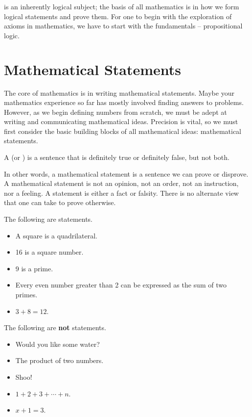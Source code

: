  is an inherently logical subject; the basis of all mathematics is in how we form logical statements and prove them. For one to begin with the exploration of axioms in mathematics, we have to start with the fundamentals -- propositional logic.

\section{Mathematical Statements}
The core of mathematics is in writing mathematical statements. Maybe your mathematics experience so far has mostly involved finding answers to problems. However, as we begin defining numbers from scratch, we must be adept at writing and communicating mathematical ideas. Precision is vital, so we must first consider the basic building blocks of all mathematical ideas: mathematical statements.

\begin{definition}
    A  (or ) is a sentence that is definitely true or definitely false, but not both.
\end{definition}

In other words, a mathematical statement is a sentence we can prove or disprove. A mathematical statement is not an opinion, not an order, not an instruction, nor a feeling. A statement is either a fact or falsity. There is no alternate view that one can take to prove otherwise.

\begin{example}
    The following are statements.
    \begin{itemize}
        \item A square is a quadrilateral.
        \item 16 is a square number.
        \item 9 is a prime.
        \item Every even number greater than 2 can be expressed as the sum of two primes.
        \item $3 + 8 = 12$.
    \end{itemize}

    \newpage

    The following are \textbf{not} statements.
    \begin{itemize}
        \item Would you like some water?
        \item The product of two numbers.
        \item Shoo!
        \item $1 + 2 + 3 + \cdots + n$.
        \item $x + 1 = 3$.
    \end{itemize}
\end{example}

